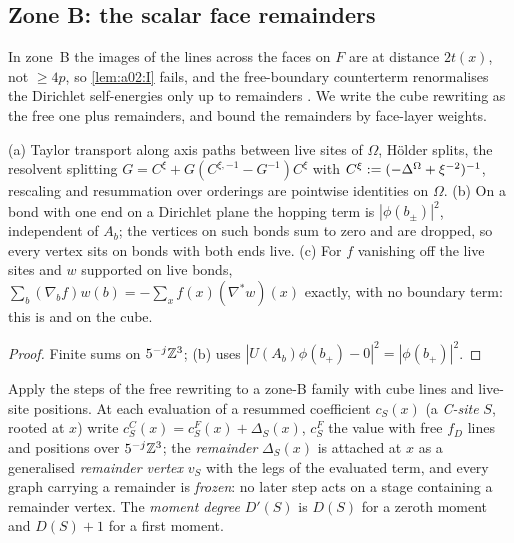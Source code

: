 \subsection{Zone B: the scalar face remainders}\label{ssec:a02:Bsc}

In zone~B the images of the lines across the faces on $F$ are at distance $2t(x)$, not $\ge4p$, so \cref{lem:a02:I} fails, and the free-boundary counterterm renormalises the Dirichlet self-energies only up to remainders \cite[pp.~331--332]{K2}. We write the cube rewriting as the free one plus remainders, and bound the remainders by face-layer weights.

\begin{lemma}\label{lem:a02:SBPC}
(a) Taylor transport along axis paths between live sites of $\Omega$, H\"older splits, the resolvent splitting $G=C^\xi+G(C^{\xi,-1}-G^{-1})C^\xi$ with $C^{\xi}:=(-\Delta^\Omega+\xi^{-2})^{-1}$, rescaling and resummation over orderings are pointwise identities on $\Omega$. (b) On a bond with one end on a Dirichlet plane the hopping term is $|\phi(b_\pm)|^2$, independent of $A_b$; the vertices on such bonds sum to zero and are dropped, so every vertex sits on bonds with both ends live. (c) For $f$ vanishing off the live sites and $w$ supported on live bonds, $\sum_b(\nabla_bf)w(b)=-\sum_xf(x)(\nabla^*w)(x)$ exactly, with no boundary term: this is \cite[(2.8)]{Ba3} and \cite[(3.16)]{K2} on the cube.
\end{lemma}
\begin{proof}
Finite sums on $5^{-j}\mathbb Z^3$; (b) uses $|U(A_b)\phi(b_+)-0|^2=|\phi(b_+)|^2$.
\end{proof}

\begin{definition}\label{def:a02:RC}
Apply the steps of the free rewriting to a zone-B family with cube lines and live-site positions. At each evaluation of a resummed coefficient $c_S(x)$ (a \emph{C-site} $S$, rooted at $x$) write $c^C_S(x)=c^F_S(x)+\Delta_S(x)$, $c^F_S$ the value with free $f_D$ lines and positions over $5^{-j}\mathbb Z^3$; the \emph{remainder} $\Delta_S(x)$ is attached at $x$ as a generalised \emph{remainder vertex} $v_S$ with the legs of the evaluated term, and every graph carrying a remainder is \emph{frozen}: no later step acts on a stage containing a remainder vertex. The \emph{moment degree} $D'(S)$ is $D(S)$ for a zeroth moment and $D(S)+1$ for a first moment.
\end{definition}

